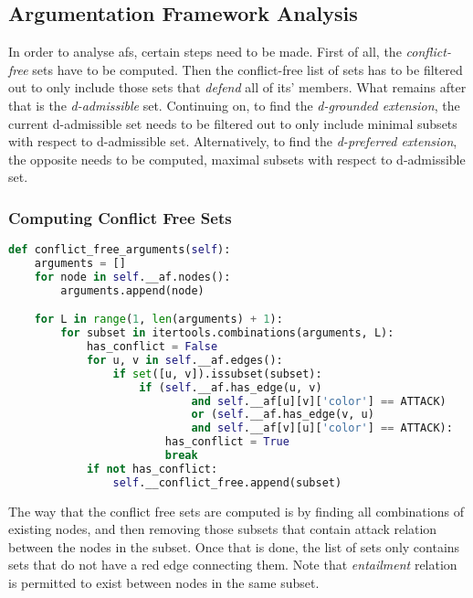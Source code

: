     \subsection{Argumentation Framework Analysis} \label{bapanalysis}
        In order to analyse \gls{af}s, certain steps need to be made. First of all, the \textit{conflict-free} sets have to be computed. Then the conflict-free list of sets has to be filtered out to only include those sets that \textit{defend} all of its' members. What remains after that is the \textit{d-admissible} set. Continuing on, to find the \textit{d-grounded extension}, the current d-admissible set needs to be filtered out to only include minimal subsets with respect to d-admissible set. Alternatively, to find the \textit{d-preferred extension}, the opposite needs to be computed, maximal subsets with respect to d-admissible set.
        
        \subsubsection{Computing Conflict Free Sets}
            \begin{lstlisting}[language=Python, caption=Conflict Free Arguments, label=code:conflictfree]
def conflict_free_arguments(self):
    arguments = []
    for node in self.__af.nodes():
        arguments.append(node)

    for L in range(1, len(arguments) + 1):
        for subset in itertools.combinations(arguments, L):
            has_conflict = False
            for u, v in self.__af.edges():
                if set([u, v]).issubset(subset):
                    if (self.__af.has_edge(u, v)
                            and self.__af[u][v]['color'] == ATTACK)
                            or (self.__af.has_edge(v, u)
                            and self.__af[v][u]['color'] == ATTACK):
                        has_conflict = True
                        break
            if not has_conflict:
                self.__conflict_free.append(subset)
            \end{lstlisting}
            
            The way that the conflict free sets are computed is by finding all combinations of existing nodes, and then removing those subsets that contain attack relation between the nodes in the subset. Once that is done, the list of sets only contains sets that do not have a red edge connecting them. Note that \textit{entailment} relation is permitted to exist between nodes in the same subset.
            
